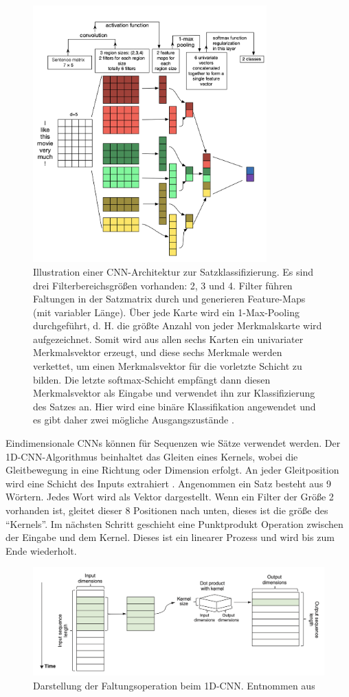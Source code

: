 \begin{figure}[H]
    \centering
    \includegraphics[width=9cm]{kapitel2/cnnnlp.png}
    \caption[CNN in der Textverarbeitung]{Illustration einer CNN-Architektur zur Satzklassifizierung. Es sind drei Filterbereichsgrößen vorhanden: 2, 3 und 4. Filter führen Faltungen in der Satzmatrix durch und generieren Feature-Maps (mit variabler Länge). Über jede Karte wird ein 1-Max-Pooling durchgeführt, d. H. die größte Anzahl von jeder Merkmalskarte wird aufgezeichnet. Somit wird aus allen sechs Karten ein univariater Merkmalsvektor erzeugt, und diese sechs Merkmale werden verkettet, um einen Merkmalsvektor für die vorletzte Schicht zu bilden. Die letzte softmax-Schicht empfängt dann diesen Merkmalsvektor als Eingabe und verwendet ihn zur Klassifizierung des Satzes an. Hier wird eine binäre Klassifikation angewendet und es gibt daher zwei mögliche Ausgangszustände \cite*{Zhang}.}
    \label{Kap2:Pooling}
\end{figure}

Eindimensionale CNNs können für Sequenzen wie Sätze verwendet werden. Der 1D-CNN-Algorithmus beinhaltet das Gleiten eines Kernels, wobei die Gleitbewegung in eine Richtung oder Dimension erfolgt. An jeder Gleitposition wird eine Schicht des Inputs extrahiert \cite[312-313]{cai2020deep}. Angenommen ein Satz besteht aus 9 Wörtern. Jedes Wort wird als Vektor dargestellt. Wenn ein Filter der Größe 2 vorhanden ist, gleitet dieser 8 Positionen nach unten, dieses ist die größe des \enquote{Kernels}. Im nächsten Schritt geschieht eine Punktprodukt Operation zwischen der Eingabe und dem Kernel. Dieses ist ein linearer Prozess und wird bis zum Ende wiederholt. 


\begin{figure}[H]
    \centering
    \includegraphics[width=13cm]{kapitel3/1dcn.png}
    \caption[1-dimensionale CNN]{Darstellung der Faltungsoperation beim 1D-CNN. Entnommen aus \cite[313]{cai2020deep}}
    \label{1dcnn}
\end{figure}